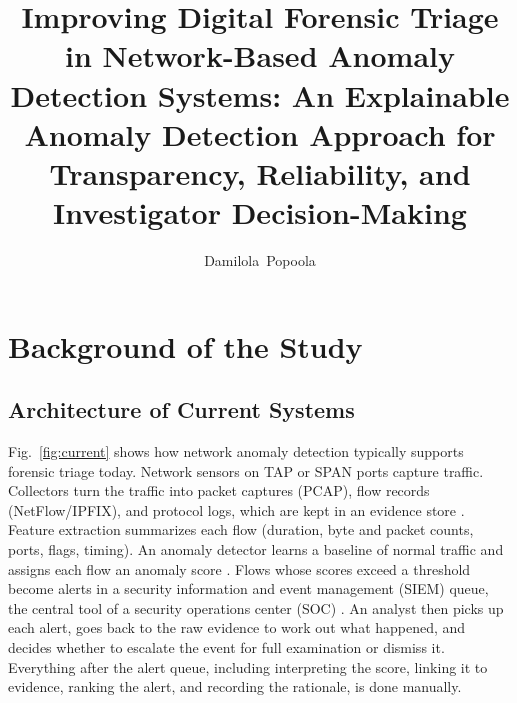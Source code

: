 \documentclass[journal]{IEEEtran}
\title{Improving Digital Forensic Triage in Network-Based Anomaly Detection Systems: An Explainable Anomaly Detection Approach for Transparency, Reliability, and Investigator Decision-Making}
\author{Damilola~Popoola}
\begin{document}
\maketitle

\section{Background of the Study}
\label{sec:background}

\subsection{Architecture of Current Systems}
Fig.~\ref{fig:current} shows how network anomaly detection typically supports forensic triage today. Network sensors on TAP or SPAN ports capture traffic. Collectors turn the traffic into packet captures (PCAP), flow records (NetFlow/IPFIX), and protocol logs, which are kept in an evidence store \cite{nist}. Feature extraction summarizes each flow (duration, byte and packet counts, ports, flags, timing). An anomaly detector learns a baseline of normal traffic and assigns each flow an anomaly score \cite{iforest,kitsune}. Flows whose scores exceed a threshold become alerts in a security information and event management (SIEM) queue, the central tool of a security operations center (SOC) \cite{gridsoc}. An analyst then picks up each alert, goes back to the raw evidence to work out what happened, and decides whether to escalate the event for full examination or dismiss it. Everything after the alert queue, including interpreting the score, linking it to evidence, ranking the alert, and recording the rationale, is done manually.
\end{document}
